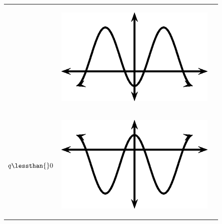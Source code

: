 \begin{center}
\begin{xtabular*}{\mytablewidth}[t]{|p{10\mystarwidth}|p{10\mystarwidth}|p{10\mystarwidth}|}
\begin{center}
\vspace{2pt}
\vspace{.1in}
\end{center}    
    &
\setcounter{subfigure}{0}
\label{m39414*id88196}
\begin{center}
\label{m39414*id88196!!!underscore!!!media}\label{m39414*id88196!!!underscore!!!printimage}\includegraphics{col11306.imgs/m39414_MG10C15_027.png} %
\vspace{2pt}
\vspace{.1in}
\end{center}    
\tabularnewline{}
    $q\lessthan{}0$
    &
\setcounter{subfigure}{0}
\label{m39414*id88234}
\begin{center}
\label{m39414*id88234!!!underscore!!!media}\label{m39414*id88234!!!underscore!!!printimage}\includegraphics{col11306.imgs/m39414_MG10C15_028.png} %
\vspace{2pt}
\vspace{.1in}

\end{center}
\end{xtabular*}
\end{center}
